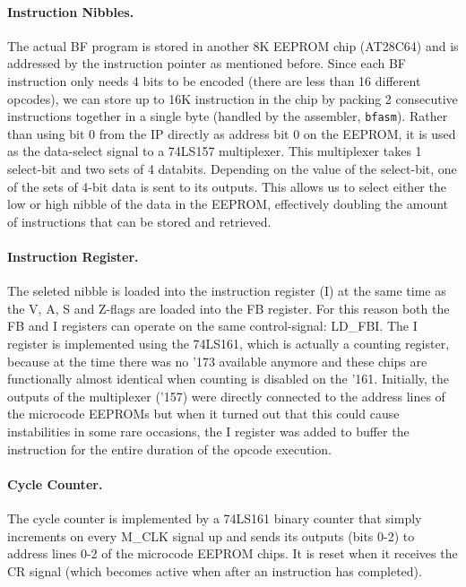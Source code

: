 \paragraph{Instruction Nibbles.} The actual BF program is stored in another 8K EEPROM chip (AT28C64) and is addressed by the instruction pointer as mentioned before. Since each BF instruction only needs 4 bits to be encoded (there are less than 16 different opcodes), we can store up to 16K instruction in the chip by packing 2 consecutive instructions together in a single byte (handled by the assembler, \texttt{bfasm}). Rather than using bit 0 from the IP directly as address bit 0 on the EEPROM, it is used as the data-select signal to a 74LS157 multiplexer. This multiplexer takes 1 select-bit and two sets of 4 databits. Depending on the value of the select-bit, one of the sets of 4-bit data is sent to its outputs. This allows us to select either the low or high nibble of the data in the EEPROM, effectively doubling the amount of instructions that can be stored and retrieved.

\paragraph{Instruction Register.} The seleted nibble is loaded into the instruction register (I) at the same time as the V, A, S and Z-flags are loaded into the FB register. For this reason both the FB and I registers can operate on the same control-signal: LD\_FBI. The I register is implemented using the 74LS161, which is actually a counting register, because at the time there was no '173 available anymore and these chips are functionally almost identical when counting is disabled on the '161. Initially, the outputs of the multiplexer ('157) were directly connected to the address lines of the microcode EEPROMs but when it turned out that this could cause instabilities in some rare occasions, the I register was added to buffer the instruction for the entire duration of the opcode execution.
 
\paragraph{Cycle Counter.} The cycle counter is implemented by a 74LS161 binary counter that simply increments on every M\_CLK signal up and sends its outputs (bits 0-2) to address lines 0-2 of the microcode EEPROM chips. It is reset when it receives the CR signal (which becomes active when after an instruction has completed).



